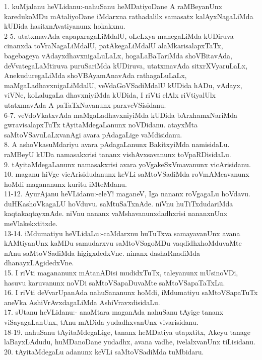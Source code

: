 \documentclass{article}
\begin{document}
1. kuMjalanu heVLidanu:-nahuSanu heMDatiyoDane A raMBeyanUnx karedukoMDu mAtaliyoDane iMdarxna rathadalilx samasatx kalAyxNagaLiMda kUDida hasitxnAvatiyanunx hokakxnu.\\
2-5. utatxmavAda capapxragaLiMdalU, oLeLxya manegaLiMda kUDiruva cinanxda toVraNagaLiMdalU, patAkegaLiMdalU alaMkarisalapxTaTx, bagebageya vAdayxdhavxnigaLuLaLx, hogaLaBaTariMda shoVBitavAda, deVvategaLaMtiruva puruSariMda kUDiruva, utatxmavAda sitxrXVyaruLaLx, AnekuduregaLiMda shoVBAyamAnavAda rathagaLuLaLx, maMgaLadhavxnigaLiMdalU, veVdaGoVSadiMdalU kUDida hADu, vAdayx, viVNe, koLalugaLa dhavxniyiMda kUDida, I riVti elAlx riVtiyalUlx utatxmavAda A paTaTxNavanunx parxveVSisidanu.\\
6-7. veVdoVkatxvAda maMgaLadhavxniyiMda kUDida bArxhamxNariMda gwravisalapxTuTx tAyitaMdegaLanunx noVDidanu. atayxMta saMtoVSavuLaLxvanAgi avara pAdagaLige vaMdisidanu.\\
8. A ashoVkasuMdariyu avara pAdagaLanunx BakitxyiMda namisidaLu. raMBeyU kUDa namasakxrisi tananx vishAvxsavanunx toVpaRDisidaLu.\\
9. tAyitaMdegaLanunx namasakxrisi avara yoVgakeSxVmavanunx vicArisidanu.\\
10. maganu hiVge vicArisidudanunx keVLi saMtoVSadiMda roVmAMcavanunx hoMdi magananunx kuritu iMteMdanu.\\
11-12. AyurAjanu heVLidanu:-eleY! maganeV, Iga nananx roVgagaLu hoVdavu. duHKashoVkagaLU hoVduvu. saMtuSaTxnAde. niVnu huTiTxdudariMda kaqtakaqtayxnAde. niVnu nananx vaMshavanunxdadhxrisi nananxnUnx meVlakekxtitxde.\\
13-14. iMdumatiyu heVLidaLu:-caMdarxnu huTuTxva samayavanUnx avana kAMtiyanUnx kaMDu samudarxvu saMtoVSagoMDu vaqdidhxhoMduvaMte nAnu saMtoVSadiMda higigxdedxVne. ninanx dashaRnadiMda dhanayxLAgidedxVne.\\
15. I riVti magananunx mAtanADisi mudidxTuTx, taleyanunx mUsinoVDi, hasuvu karuvanunx noVDi saMtoVSapaDuvaMte saMtoVSapaTaTxLu.\\
16. I riVti deVvarUpanAda nahuSananunx hoMdi, iMdumatiyu saMtoVSapaTuTx aneVka AshiVrAvxdagaLiMda AshiVravxdisidaLu.\\
17. sUtanu heVLidanu:- anaMtara maganAda nahuSanu tAyige tananx viSayagaLanUnx, tAnu mADida yudadhxvanUnx vivarisidanu.\\
18-19. nahuSanu tAyitaMdegaLige, tananx heMDatiya utapxtitx, Akeyu tanage laBayxLAdudu, huMDanoDane yudadhx, avana vadhe, ivelalxvanUnx tiLisidanu.\\
20. tAyitaMdegaLu adanunx keVLi saMtoVSadiMda tuMbidaru.\\
\end{document}
